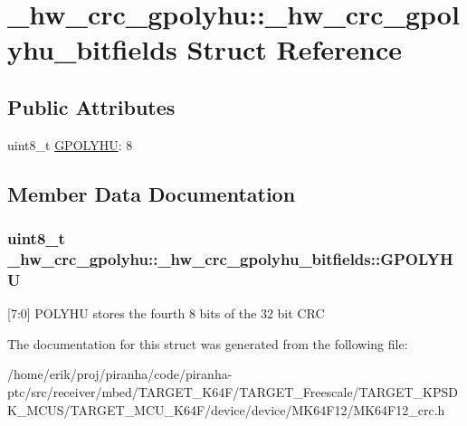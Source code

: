 \hypertarget{struct__hw__crc__gpolyhu_1_1__hw__crc__gpolyhu__bitfields}{}\section{\+\_\+hw\+\_\+crc\+\_\+gpolyhu\+:\+:\+\_\+hw\+\_\+crc\+\_\+gpolyhu\+\_\+bitfields Struct Reference}
\label{struct__hw__crc__gpolyhu_1_1__hw__crc__gpolyhu__bitfields}
\subsection*{Public Attributes}
\begin{DoxyCompactItemize}
\item 
uint8\+\_\+t \hyperlink{struct__hw__crc__gpolyhu_1_1__hw__crc__gpolyhu__bitfields_a872d6197b7348f50100b8a3516017042}{G\+P\+O\+L\+Y\+HU}\+: 8
\end{DoxyCompactItemize}


\subsection{Member Data Documentation}
\subsubsection[{\texorpdfstring{G\+P\+O\+L\+Y\+HU}{GPOLYHU}}]{\setlength{\rightskip}{0pt plus 5cm}uint8\+\_\+t \+\_\+hw\+\_\+crc\+\_\+gpolyhu\+::\+\_\+hw\+\_\+crc\+\_\+gpolyhu\+\_\+bitfields\+::\+G\+P\+O\+L\+Y\+HU}\hypertarget{struct__hw__crc__gpolyhu_1_1__hw__crc__gpolyhu__bitfields_a872d6197b7348f50100b8a3516017042}{}\label{struct__hw__crc__gpolyhu_1_1__hw__crc__gpolyhu__bitfields_a872d6197b7348f50100b8a3516017042}
\mbox{[}7\+:0\mbox{]} P\+O\+L\+Y\+HU stores the fourth 8 bits of the 32 bit C\+RC 

The documentation for this struct was generated from the following file\+:\begin{DoxyCompactItemize}
\item 
/home/erik/proj/piranha/code/piranha-\/ptc/src/receiver/mbed/\+T\+A\+R\+G\+E\+T\+\_\+\+K64\+F/\+T\+A\+R\+G\+E\+T\+\_\+\+Freescale/\+T\+A\+R\+G\+E\+T\+\_\+\+K\+P\+S\+D\+K\+\_\+\+M\+C\+U\+S/\+T\+A\+R\+G\+E\+T\+\_\+\+M\+C\+U\+\_\+\+K64\+F/device/device/\+M\+K64\+F12/M\+K64\+F12\+\_\+crc.\+h\end{DoxyCompactItemize}
